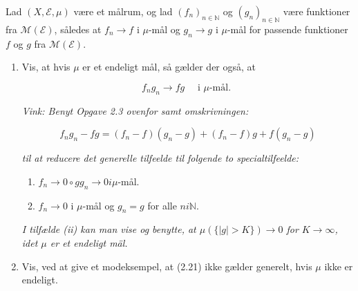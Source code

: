 \documentclass{Class}
\begin{document}
Lad $(X, \mathcal{E}, \mu)$ være et målrum, og lad $\left(f_n\right)_{n \in \mathbb{N}}$ og $\left(g_n\right)_{n \in \mathbb{N}}$ være funktioner fra $\mathcal{M}(\mathcal{E})$, således at $f_n \rightarrow f$ i $\mu$-mål og $g_n \rightarrow g$ i $\mu$-mål for passende funktioner $f$ og $g$ fra $\mathcal{M}(\mathcal{E})$.
\begin{enumerate}
    \item Vis, at hvis $\mu$ er et endeligt mål, så gælder der også, at

    $$
    f_n g_n \longrightarrow f g \quad \text { i } \mu \text {-mål. }
    $$
    
    \textit{Vink: Benyt Opgave 2.3 ovenfor samt omskrivningen:}
    
    $$
    f_n g_n-f g=\left(f_n-f\right)\left(g_n-g\right)+\left(f_n-f\right) g+f\left(g_n-g\right)
    $$
    
    \textit{til at reducere det generelle tilfeelde til folgende to specialtilfeelde:}
    \begin{enumerate}
        \item  $f_n \rightarrow 0 \circ g g_n \rightarrow 0 i \mu$-mål.
        \item $f_n \rightarrow 0$ i $\mu$-mål og $g_n=g$ for alle $n i \mathbb{N}$.
    \end{enumerate}
    
    \textit{I tilfælde (ii) kan man vise og benytte, at $\mu(\{|g|>K\}) \rightarrow 0$ for $K \rightarrow \infty$, idet $\mu$ er et endeligt mäl.}
    \item Vis, ved at give et modeksempel, at (2.21) ikke gælder generelt, hvis $\mu$ ikke er endeligt.
\end{enumerate}
\solution
\end{document}
